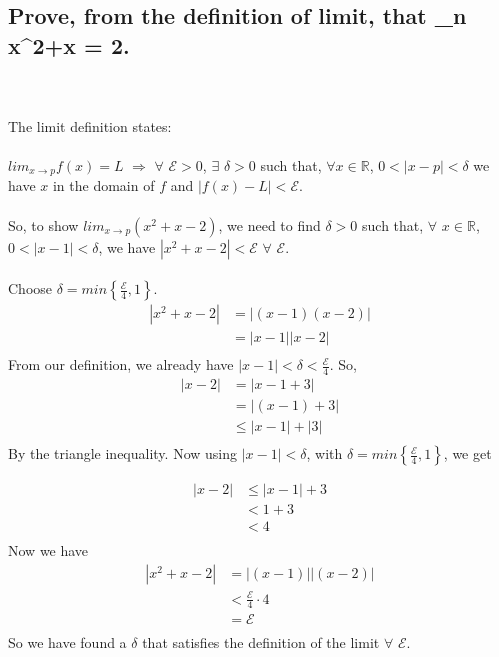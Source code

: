 \documentclass{article}
\begin{document}
\subsection*{Prove, from the definition of limit, that \lim_{n\to\infty} x^2+x = 2.}
\solution
\\\\
The limit definition states:
\\\\
\(lim_{x\to p} f(x) = L\) \(\Rightarrow\) \(\forall\) \(\mathcal{E} > 0\), \(\exists\) \(\delta > 0\) such that, \(\forall x \in \mathds{R}\), \(0 < |x-p| < \delta\) we have \(x\) in the domain of \(f\) and \(|f(x)-L| < \mathcal{E}\).
\\
\\
So, to show \(lim_{x\to p} (x^2 + x - 2)\), we need to find \(\delta > 0\) such that, \(\forall\) \(x \in \mathds{R}\), \(0<|x-1|<\delta\), we have \(|x^2+x-2| < \mathcal{E}\) \(\forall\) \(\mathcal{E}\).
\\
\\
Choose \(\delta = min\left\{\frac{\mathcal{E}}{4},1\right\}\).
\\
\begin{align*}
  |x^2 + x - 2| &= |(x-1)(x-2)| \\
  &= |x-1||x-2|\\
\end{align*}
From our definition, we already have \(|x-1| < \delta < \frac{\mathcal{E}}{4}\). So,
\\
\begin{align*}
  |x-2| &= |x-1+3| \\
  &= |(x-1)+3| \\
  &\leq |x-1| + |3| \\
\end{align*}
By the triangle inequality. Now using \(|x-1| < \delta\), with \(\delta = min\left\{\frac{\mathcal{E}}{4},1\right\}\), we get

\begin{align*}
	|x-2| &\leq |x-1| + 3 \\
	&< 1 + 3 \\
	&< 4 \\
\end{align*}
Now we have
\begin{align*}
	|x^2 + x - 2| &= |(x-1)||(x-2)| \\
	&< \frac{\mathcal{E}}{4}\cdot4 \\
	&= \mathcal{E}\\
\end{align*}
So we have found a \(\delta\) that satisfies the definition of the limit \(\forall\) \(\mathcal{E}\).
\end{document}
